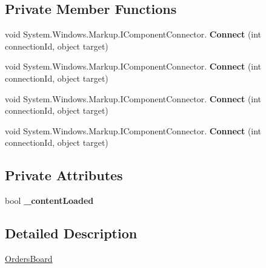 \subsection*{Private Member Functions}
\begin{DoxyCompactItemize}
\item 
\mbox{\label{class_t_h_b___plugin___orders_1_1_orders_board_ada300d5554820e4bef6e5ef58e45e221}} 
void System.\+Windows.\+Markup.\+I\+Component\+Connector. {\bfseries Connect} (int connection\+Id, object target)
\item 
\mbox{\label{class_t_h_b___plugin___orders_1_1_orders_board_ada300d5554820e4bef6e5ef58e45e221}} 
void System.\+Windows.\+Markup.\+I\+Component\+Connector. {\bfseries Connect} (int connection\+Id, object target)
\item 
\mbox{\label{class_t_h_b___plugin___orders_1_1_orders_board_ada300d5554820e4bef6e5ef58e45e221}} 
void System.\+Windows.\+Markup.\+I\+Component\+Connector. {\bfseries Connect} (int connection\+Id, object target)
\item 
\mbox{\label{class_t_h_b___plugin___orders_1_1_orders_board_ada300d5554820e4bef6e5ef58e45e221}} 
void System.\+Windows.\+Markup.\+I\+Component\+Connector. {\bfseries Connect} (int connection\+Id, object target)
\end{DoxyCompactItemize}
\subsection*{Private Attributes}
\begin{DoxyCompactItemize}
\item 
\mbox{\label{class_t_h_b___plugin___orders_1_1_orders_board_a5b500b10816d90a096341d0fd26f839e}} 
bool {\bfseries \+\_\+content\+Loaded}
\end{DoxyCompactItemize}


\subsection{Detailed Description}
\mbox{\hyperlink{class_t_h_b___plugin___orders_1_1_orders_board}{Orders\+Board}} 

